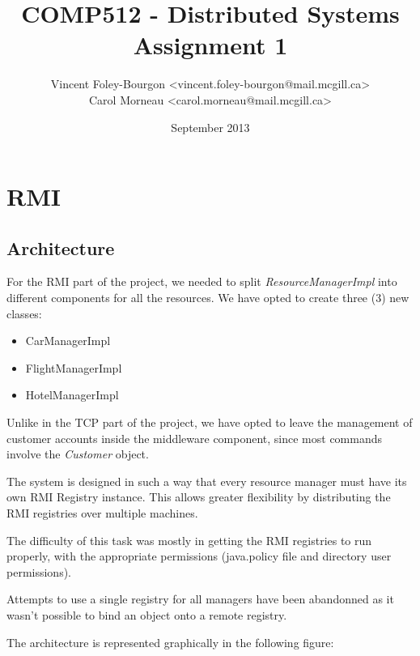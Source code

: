 \documentclass[11pt]{article}
\begin{document}
\title{COMP512 - Distributed Systems \\ Assignment 1}
\author{
  Vincent Foley-Bourgon <vincent.foley-bourgon@mail.mcgill.ca> \\
  Carol Morneau <carol.morneau@mail.mcgill.ca>
}
\date{September 2013}

\maketitle




\section{RMI}

\subsection{Architecture}

For the RMI part of the project, we needed to split {\it
  ResourceManagerImpl} into different components for all the
resources.  We have opted to create three (3) new classes:


\begin{itemize}
  \item CarManagerImpl
  \item FlightManagerImpl
  \item HotelManagerImpl
\end{itemize}

Unlike in the TCP part of the project, we have opted to leave the
management of customer accounts inside the middleware component, since
most commands involve the {\it Customer} object.

The system is designed in such a way that every resource manager must
have its own RMI Registry instance.  This allows greater flexibility
by distributing the RMI registries over multiple machines.

The difficulty of this task was mostly in getting the RMI registries
to run properly, with the appropriate permissions (java.policy file
and directory user permissions).

Attempts to use a single registry for all managers have been
abandonned as it wasn't possible to bind an object onto a remote
registry.

The architecture is represented graphically in the following figure:
\end{document}
